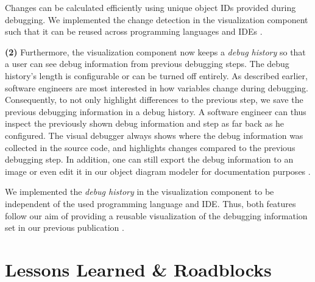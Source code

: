 \documentclass[sigconf]{acmart}
\begin{document}
Changes can be calculated efficiently using unique object IDs provided during debugging.
We implemented the change detection in the visualization component such that it can be reused across programming languages and IDEs \cite{timkrauterICSE2024Artifacts2023}.

\textbf{(2)} Furthermore, the visualization component now keeps a \textit{debug history} so that a user can see debug information from previous debugging steps.
The debug history's length is configurable or can be turned off entirely.
As described earlier, software engineers are most interested in how variables change during debugging.
Consequently, to not only highlight differences to the previous step, we save the previous debugging information in a debug history.
A software engineer can thus inspect the previously shown debug information and step as far back as he configured.
The visual debugger always shows where the debug information was collected in the source code, and highlights changes compared to the previous debugging step.
In addition, one can still export the debug information to an image or even edit it in our object diagram modeler \cite{timkrauterObjectdiagramjs2023} for documentation purposes \cite{krauterVisualDebuggerTool2022}.

We implemented the \textit{debug history} in the visualization component to be independent of the used programming language and IDE.
Thus, both features follow our aim of providing a reusable visualization of the debugging information set in our previous publication \cite{krauterVisualDebuggerTool2022}.

\section{Lessons Learned \& Roadblocks} \label{sec:lessonsLearned}

\end{document}
